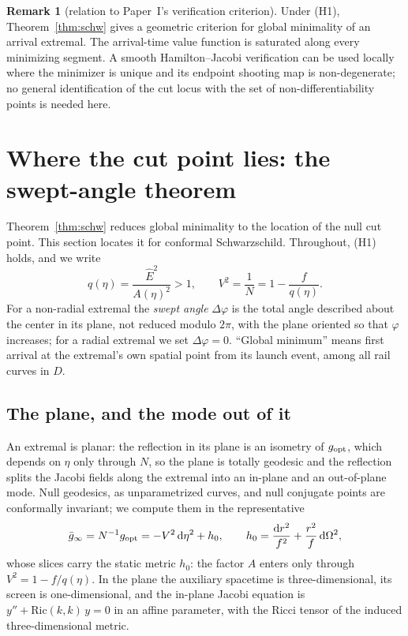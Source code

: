 \documentclass[aip,jmp,amsmath,amssymb,reprint]{revtex4-2}
\newcommand{\Ehat}{\hat E}
\newcommand{\dd}{\mathrm{d}}
\newcommand{\gopt}{g_{\rm opt}}
\theoremstyle{plain}
\theoremstyle{definition}
\newtheorem{remark}[proposition]{Remark}
\begin{document}
\begin{remark}[relation to Paper~I's verification criterion]
Under (H1), Theorem~\ref{thm:schw} gives a geometric criterion for
global minimality of an arrival extremal. The arrival-time value
function is saturated along every minimizing segment. A smooth
Hamilton--Jacobi verification can be used locally where the
minimizer is unique and its endpoint shooting map is non-degenerate;
no general identification of the cut locus with the set of
non-differentiability points is needed here.
\end{remark}

\section{Where the cut point lies: the swept-angle theorem}
\label{sec:angle}
Theorem~\ref{thm:schw} reduces global minimality to the location of the null cut
point. This section locates it for conformal Schwarzschild. Throughout, (H1) holds, and
we write
\begin{equation}
  q(\eta)=\frac{\Ehat^2}{A(\eta)^2}>1,\qquad V^2=\frac1N=1-\frac{f}{q(\eta)} .
  \label{eq:q}
\end{equation}
For a non-radial extremal the \emph{swept angle} $\Delta\varphi$ is the total angle
described about the center in its plane, not reduced modulo $2\pi$, with the plane
oriented so that $\varphi$ increases; for a radial extremal we set $\Delta\varphi=0$.
``Global minimum'' means first arrival at the extremal's own spatial point from its
launch event, among all rail curves in $D$.

\subsection{The plane, and the mode out of it}
\label{sec:plane}
An extremal is planar: the reflection in its plane is an isometry of $\gopt$, which
depends on $\eta$ only through $N$, so the plane is totally geodesic and the reflection
splits the Jacobi fields along the extremal into an in-plane and an out-of-plane mode.
Null geodesics, as unparametrized curves, and null conjugate points are conformally invariant;
we compute them in the representative
\begin{equation}
  \bar g_\infty=N^{-1}\gopt=-V^2\,\dd\eta^2+h_0,\qquad h_0=\frac{\dd r^2}{f^2}+\frac{r^2}{f}\,\dd\Omega^2,
  \label{eq:ginf}
\end{equation}
whose slices carry the static metric $h_0$: the factor $A$ enters only through $V^2=1-f/q(\eta)$.
In the plane the auxiliary spacetime is three-dimensional, its screen is one-dimensional, and
the in-plane Jacobi equation is $y''+\mathrm{Ric}(k,k)\,y=0$ in an affine parameter, with the Ricci
tensor of the induced three-dimensional metric.
\end{document}
